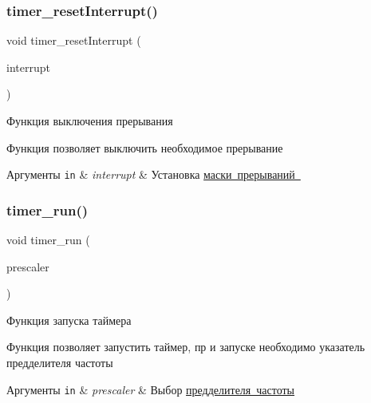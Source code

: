 \subsubsection{\texorpdfstring{timer\+\_\+reset\+Interrupt()}{timer\_resetInterrupt()}}
{\footnotesize\ttfamily void timer\+\_\+reset\+Interrupt (\begin{DoxyParamCaption}\item[{\mbox{\hyperlink{group__timer_counter_ga2e7008f5da185cf8ce62fb0e5f3079ff}{T\+I\+M\+E\+R\+\_\+\+I\+N\+T\+R\+R\+U\+PT}}}]{interrupt }\end{DoxyParamCaption})}



Функция выключения прерывания 

Функция позволяет выключить необходимое прерывание


\begin{DoxyParams}[1]{Аргументы}
\mbox{\tt in}  & {\em interrupt} & Установка \mbox{\hyperlink{group__timer_counter_ga2e7008f5da185cf8ce62fb0e5f3079ff}{маски прерываний }} \\
\hline
\end{DoxyParams}
\mbox{\label{group__timer_counter_ga2c3327261a8a0b6726fbd8cf67c59036}} 
\subsubsection{\texorpdfstring{timer\+\_\+run()}{timer\_run()}}
{\footnotesize\ttfamily void timer\+\_\+run (\begin{DoxyParamCaption}\item[{\mbox{\hyperlink{group__timer_counter_ga7e6cbe0bc6f3395283c560bdc0690447}{T\+I\+M\+E\+R\+\_\+\+P\+R\+E\+S\+C\+A\+L\+ER}}}]{prescaler }\end{DoxyParamCaption})}



Функция запуска таймера 

Функция позволяет запустить таймер, пр и запуске необходимо указатель предделителя частоты 
\begin{DoxyParams}[1]{Аргументы}
\mbox{\tt in}  & {\em prescaler} & Выбор \mbox{\hyperlink{group__timer_counter_ga7e6cbe0bc6f3395283c560bdc0690447}{предделителя частоты}} \\
\hline
\end{DoxyParams}
\mbox{\label{group__timer_counter_ga5df53b7b2c83f7e7c7211cb469c64998}} 
